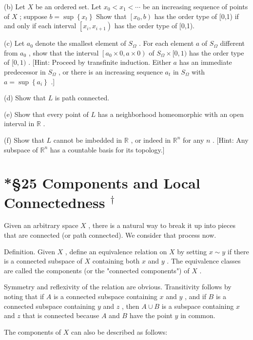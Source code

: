 \documentclass[10pt]{article}
\begin{document}
(b) Let \(X\) be an ordered set. Let \({x}_{0} < {x}_{1} < \cdots\) be an increasing sequence of points of \(X\) ; suppose \(b = \sup \left\{  {x}_{t}\right\}\) Show that \(\left\lbrack  {{x}_{0},b}\right)\) has the order type of [0,1) if and only if each interval \(\left\lbrack  {{x}_{i},{x}_{i + 1}}\right)\) has the order type of [0,1).

(c) Let \({a}_{0}\) denote the smallest element of \({S}_{\Omega }\) . For each element \(a\) of \({S}_{\Omega }\) different from \({a}_{0}\) , show that the interval \(\left\lbrack  {{a}_{0} \times  0,a \times  0}\right)\) of \({S}_{\Omega } \times  \lbrack 0,1)\) has the order type of \(\lbrack 0,1)\) . [Hint: Proceed by transfinite induction. Either \(a\) has an immediate predecessor in \({S}_{\Omega }\) , or there is an increasing sequence \({a}_{t}\) in \({S}_{\Omega }\) with \(a = \sup \left\{  {a}_{i}\right\}\) .]

(d) Show that \(L\) is path connected.

(e) Show that every point of \(L\) has a neighborhood homeomorphic with an open interval in \(\mathbb{R}\) .

(f) Show that \(L\) cannot be imbedded in \(\mathbb{R}\) , or indeed in \({\mathbb{R}}^{n}\) for any \(n\) . [Hint: Any subspace of \({\mathbb{R}}^{n}\) has a countable basis for its topology.]

\section*{*§25 Components and Local Connectedness \({}^{ \dagger  }\)}

Given an arbitrary space \(X\) , there is a natural way to break it up into pieces that are connected (or path connected). We consider that process now.

Definition. Given \(X\) , define an equivalence relation on \(X\) by setting \(x \sim  y\) if there is a connected subspace of \(X\) containing both \(x\) and \(y\) . The equivalence classes are called the components (or the "connected components") of \(X\) .

Symmetry and reflexivity of the relation are obvious. Transitivity follows by noting that if \(A\) is a connected subspace containing \(x\) and \(y\) , and if \(B\) is a connected subspace containing \(y\) and \(z\) , then \(A \cup  B\) is a subspace containing \(x\) and \(z\) that is connected because \(A\) and \(B\) have the point \(y\) in common.

The components of \(X\) can also be described as follows:
\end{document}
